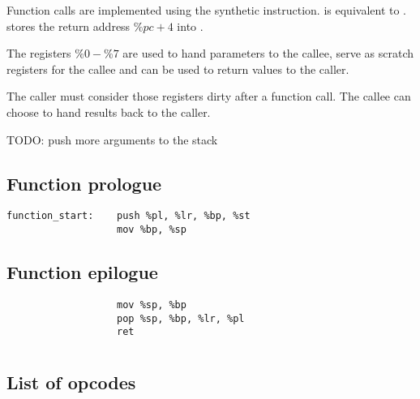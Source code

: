 \documentclass{article}
\begin{document}
Function calls are implemented using the synthetic 
instruction.  is equivalent to .  stores the return address \(\%pc + 4\) into .

The registers \(\%0 - \%7\) are used to hand parameters to the callee,
serve as scratch registers for the callee and can be used to return
values to the caller.

The caller must consider those registers dirty after a function call.
The callee can choose to hand results back to the caller.

TODO: push more arguments to the stack

\subsection{Function prologue}

\begin{lstlisting}
function_start:    push %pl, %lr, %bp, %st
                   mov %bp, %sp
\end{lstlisting}

\subsection{Function epilogue}

\begin{lstlisting}
                   mov %sp, %bp
                   pop %sp, %bp, %lr, %pl
                   ret
\end{lstlisting}

\appendix
\section{\appendixname}

\subsection{List of opcodes}

\end{document}
